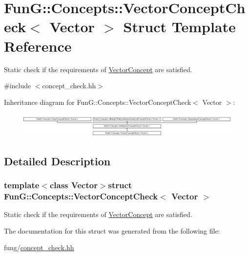 \hypertarget{structFunG_1_1Concepts_1_1VectorConceptCheck}{\section{Fun\-G\-:\-:Concepts\-:\-:Vector\-Concept\-Check$<$ Vector $>$ Struct Template Reference}
\label{structFunG_1_1Concepts_1_1VectorConceptCheck}
}


Static check if the requirements of \hyperlink{structFunG_1_1Concepts_1_1VectorConcept}{Vector\-Concept} are satisfied.  




{\ttfamily \#include $<$concept\-\_\-check.\-hh$>$}

Inheritance diagram for Fun\-G\-:\-:Concepts\-:\-:Vector\-Concept\-Check$<$ Vector $>$\-:\begin{figure}[H]
\begin{center}
\leavevmode
\includegraphics[height=1.287356cm]{structFunG_1_1Concepts_1_1VectorConceptCheck}
\end{center}
\end{figure}


\subsection{Detailed Description}
\subsubsection*{template$<$class Vector$>$struct Fun\-G\-::\-Concepts\-::\-Vector\-Concept\-Check$<$ Vector $>$}

Static check if the requirements of \hyperlink{structFunG_1_1Concepts_1_1VectorConcept}{Vector\-Concept} are satisfied. 

The documentation for this struct was generated from the following file\-:\begin{DoxyCompactItemize}
\item 
fung/\hyperlink{concept__check_8hh}{concept\-\_\-check.\-hh}\end{DoxyCompactItemize}
